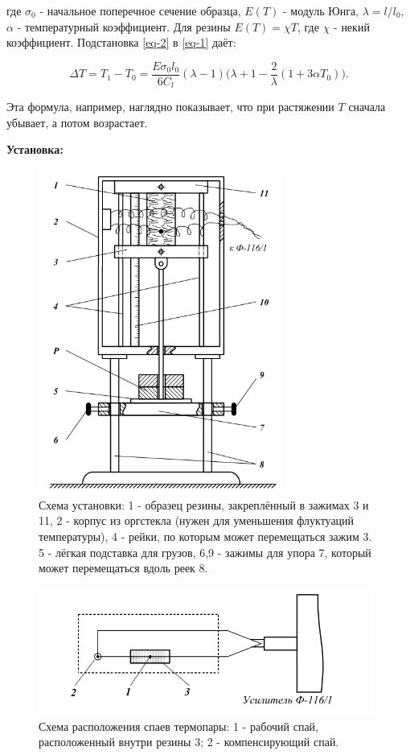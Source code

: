 \documentclass[a4paper,12pt]{article}
\begin{document}
где $\sigma_0$ - начальное поперечное сечение образца, $E(T)$ - модуль Юнга, $\lambda = l/l_0$,  $\alpha$ - температурный коэффициент. Для резины $E(T) = \chi T$, где $\chi$ - некий коэффициент. 
Подстановка \ref{eq-2} в \ref{eq-1} даёт:

\begin{equation} \label{eq-3}
\Delta T = T_1 - T_0 = \frac{E\sigma_0 l_0}{6 C_l}(\lambda - 1) \bigg( \lambda + 1 - \frac{2}{\lambda}(1 + 3\alpha T_0)\bigg).
\end{equation}

Эта формула, например, наглядно показывает, что при растяжении $T$ сначала убывает, а потом возрастает.

\bigskip
\textbf{Установка:}

\begin{figure}[ht]
\centering
\includegraphics[width=80mm]{schema1.png}
\caption{Схема установки: 1 - образец резины, закреплённый в зажимах 3 и 11, 2 - корпус из оргстекла (нужен для уменьшения флуктуаций температуры), 4 - рейки, по которым может перемещаться зажим 3. 5 - лёгкая подставка для грузов, 6,9 - зажимы для упора 7, который может перемещаться вдоль реек 8. }\label{schema}
\end{figure}

\begin{figure}[ht]
\centering
\includegraphics[width=110mm]{schema2.png}
\caption{Схема расположения спаев термопары: 1 - рабочий спай, расположенный внутри резины 3; 2 - компенсирующий спай.}\label{schema}
\end{figure}
\bigskip
\end{document}

